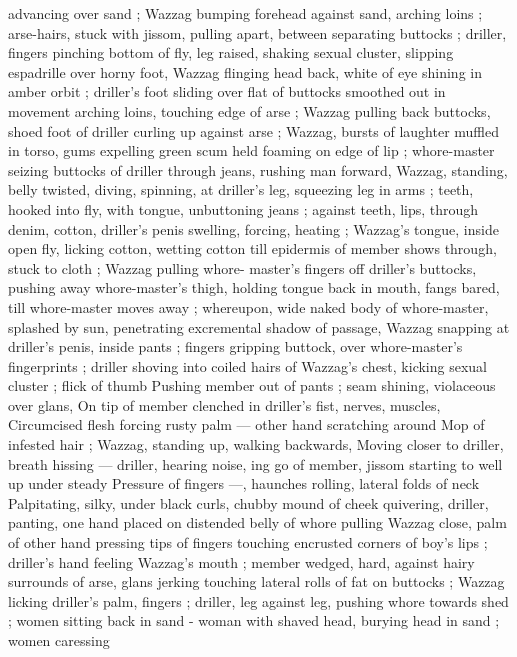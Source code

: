 {advancing over sand ; Wazzag bumping forehead against sand, 
arching loins ; arse-hairs, stuck with jissom, pulling apart, between 
separating buttocks ; driller, fingers pinching bottom of fly, leg 
raised, shaking sexual cluster, slipping espadrille over horny foot, 
Wazzag flinging head back, white of eye shining in amber orbit ; 
driller's foot sliding over flat of buttocks smoothed out in movement 
arching loins, touching edge of arse ; Wazzag pulling back buttocks, 
shoed foot of driller curling up against arse ; Wazzag, bursts of 
laughter muffled in torso, gums expelling green scum held foaming 
on edge of lip ; whore-master seizing buttocks of driller through 
jeans, rushing man forward, Wazzag, standing, belly twisted, diving, 
spinning, at driller's leg, squeezing leg in arms ; teeth, hooked into 
fly, with tongue, unbuttoning jeans ; against teeth, lips, through 
denim, cotton, driller's penis swelling, forcing, heating ; Wazzag's 
tongue, inside open fly, licking cotton, wetting cotton till epidermis 
of member shows through, stuck to cloth ; Wazzag pulling whore- 
master's fingers off driller's buttocks, pushing away whore-master's 
thigh, holding tongue back in mouth, fangs bared, till whore-master 
moves away ; whereupon, wide naked body of whore-master, 
splashed by sun, penetrating excremental shadow of passage, 
Wazzag snapping at driller's penis, inside pants ; fingers gripping 
buttock, over whore-master's fingerprints ; driller shoving into coiled 
hairs of Wazzag's chest, kicking sexual cluster ; flick of thumb 
Pushing member out of pants ; seam shining, violaceous over glans, 
On tip of member clenched in driller's fist, nerves, muscles, 
Circumcised flesh forcing rusty palm --- other hand scratching around 
Mop of infested hair ; Wazzag, standing up, walking backwards, 
Moving closer to driller, breath hissing --- driller, hearing noise, 
ing go of member, jissom starting to well up under steady 
Pressure of fingers ---, haunches rolling, lateral folds of neck 
Palpitating, silky, under black curls, chubby mound of cheek 
quivering, driller, panting, one hand placed on distended belly of 
whore pulling Wazzag close, palm of other hand pressing tips of 
fingers touching encrusted corners of boy's lips ; driller's hand 
feeling Wazzag's mouth ; member wedged, hard, against hairy 
surrounds of arse, glans jerking touching lateral rolls of fat on 
buttocks ; Wazzag licking driller's palm, fingers ; driller, leg against 
leg, pushing whore towards shed ; women sitting back in sand - 
woman with shaved head, burying head in sand ; women caressing 
}
